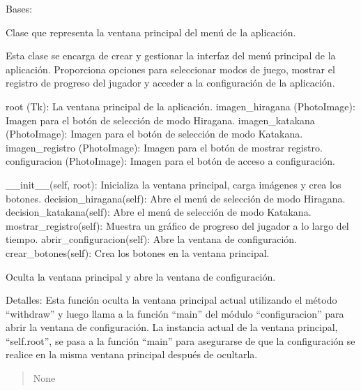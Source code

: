 \documentclass[letterpaper,10pt,spanish]{sphinxmanual}
\begin{document}
\begin{fulllineitems}
\label{\detokenize{main:main.MenuPrincipal}}
\pysigstartsignatures
{}
\pysigstopsignatures
\sphinxAtStartPar
Bases: 

\sphinxAtStartPar
Clase que representa la ventana principal del menú de la aplicación.

\sphinxAtStartPar
Esta clase se encarga de crear y gestionar la interfaz del menú principal de la aplicación. Proporciona opciones
para seleccionar modos de juego, mostrar el registro de progreso del jugador y acceder a la configuración de la
aplicación.
\begin{description}
\sphinxAtStartPar
root (Tk): La ventana principal de la aplicación.
imagen\_hiragana (PhotoImage): Imagen para el botón de selección de modo Hiragana.
imagen\_katakana (PhotoImage): Imagen para el botón de selección de modo Katakana.
imagen\_registro (PhotoImage): Imagen para el botón de mostrar registro.
configuracion (PhotoImage): Imagen para el botón de acceso a configuración.

\sphinxAtStartPar
\_\_init\_\_(self, root): Inicializa la ventana principal, carga imágenes y crea los botones.
decision\_hiragana(self): Abre el menú de selección de modo Hiragana.
decision\_katakana(self): Abre el menú de selección de modo Katakana.
mostrar\_registro(self): Muestra un gráfico de progreso del jugador a lo largo del tiempo.
abrir\_configuracion(self): Abre la ventana de configuración.
crear\_botones(self): Crea los botones en la ventana principal.

\end{description}

\begin{fulllineitems}
\label{\detokenize{main:main.MenuPrincipal.abrir_configuracion}}
\pysigstartsignatures
{}
\pysigstopsignatures
\sphinxAtStartPar
Oculta la ventana principal y abre la ventana de configuración.

\sphinxAtStartPar
Detalles:
Esta función oculta la ventana principal actual utilizando el método “withdraw” y luego llama a la
función “main” del módulo “configuracion” para abrir la ventana de configuración. La instancia actual de la
ventana principal, “self.root”, se pasa a la función “main” para asegurarse de que la configuración se
realice en la misma ventana principal después de ocultarla.
\begin{quote}\begin{description}
\sphinxAtStartPar
None


\end{description}
\end{quote}
\end{fulllineitems}
\end{fulllineitems}
\end{document}
